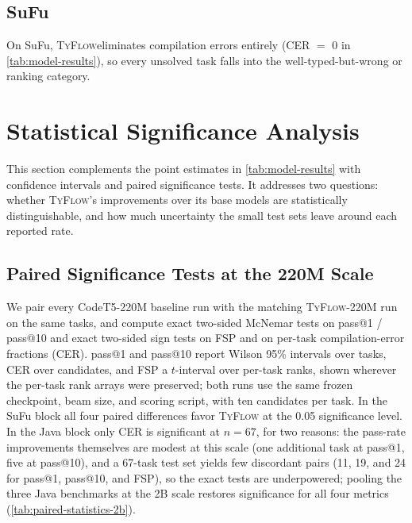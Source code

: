 \documentclass[manuscript,screen]{acmart}
\newcommand{\toolname}[1]{\textsc{#1}}
\newcommand{\mainname}{\toolname{TyFlow}\xspace}
\begin{document}
\subsection{{\color{revblue}SuFu}}

{\color{revblue}On SuFu, }\mainname {\color{revblue}eliminates compilation errors entirely (CER $=$ 0 in }\autoref{tab:model-results}{\color{revblue}), so every unsolved task falls into the well-typed-but-wrong or ranking category.
}

\section{{\color{revblue}Statistical Significance Analysis}}
\label{appendix-statistics}

{\color{revblue}This section complements the point estimates in }\autoref{tab:model-results} {\color{revblue}with confidence intervals and paired significance tests. It addresses two questions: whether }\mainname{\color{revblue}'s improvements over its base models are statistically distinguishable, and how much uncertainty the small test sets leave around each reported rate.
}

\subsection{{\color{revblue}Paired Significance Tests at the 220M Scale}}
\label{appendix-statistics-220m}

{\color{revblue}We pair every CodeT5-220M baseline run with the matching }\mainname{\color{revblue}-220M run on the same tasks, and compute exact two-sided McNemar tests on pass@1 / pass@10 and exact two-sided sign tests on FSP and on per-task compilation-error fractions (CER).
pass@1 and pass@10 report Wilson 95\% intervals over tasks, CER over candidates, and FSP a $t$-interval over per-task ranks, shown wherever the per-task rank arrays were preserved; both runs use the same frozen checkpoint, beam size, and scoring script, with ten candidates per task.
In the SuFu block all four paired differences favor }\mainname{} {\color{revblue}at the 0.05 significance level.
In the Java block only CER is significant at $n=67$, for two reasons: the pass-rate improvements themselves are modest at this scale (one additional task at pass@1, five at pass@10), and a 67-task test set yields few discordant pairs (11, 19, and 24 for pass@1, pass@10, and FSP), so the exact tests are underpowered; pooling the three Java benchmarks at the 2B scale restores significance for all four metrics (}\autoref{tab:paired-statistics-2b}{\color{revblue}).
}
\end{document}
